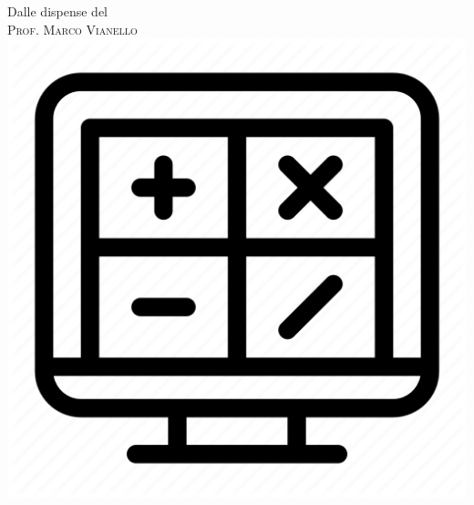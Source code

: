 \documentclass[12pt,a4paper,headings=optiontohead]{scrbook}
\begin{document}

\begin{titlepage}

\newcommand{\HRule}{\rule{\linewidth}{0.5mm}} %

\center %
 


\large Dalle dispense del\\[0.5cm] %
\textsc{\Large Prof. Marco Vianello}\\[1.5cm] %

\includegraphics[scale=0.13]{maths.png}\\[0.3cm]


\end{titlepage}
\end{document}

